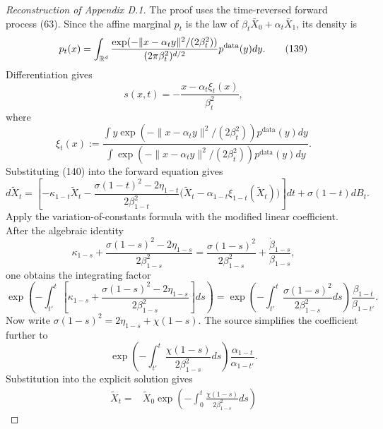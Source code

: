 \begin{proof}[Reconstruction of Appendix D.1]
The proof uses the time-reversed forward process (63).  Since the affine marginal $p_t$ is the law of $\beta_t\bar X_0+\alpha_t\bar X_1$, its density is
\begin{equation*}
 p_t(x)=\int_{\mathbb{R}^d}
 \frac{\exp(-\|x-\alpha_ty\|^2/(2\beta_t^2))}{(2\pi\beta_t^2)^{d/2}}
 p^{\mathrm{data}}(y)dy.
 \tag{139}
\end{equation*}
Differentiation gives
\begin{equation*}
 s(x,t)=-\frac{x-\alpha_t\xi_t(x)}{\beta_t^2},
 \tag{140}
\end{equation*}
where
\begin{equation*}
 \xi_t(x):=
 \frac{\int y\exp(-\|x-\alpha_ty\|^2/(2\beta_t^2))p^{\mathrm{data}}(y)dy}
 {\int \exp(-\|x-\alpha_ty\|^2/(2\beta_t^2))p^{\mathrm{data}}(y)dy}.
 \tag{141}
\end{equation*}
Substituting (140) into the forward equation gives
\begin{equation*}
 d\widetilde X_t=
 \left[
 -\kappa_{1-t}\widetilde X_t
 -\frac{\sigma(1-t)^2-2\eta_{1-t}}{2\beta_{1-t}^2}
 \bigl(\widetilde X_t-\alpha_{1-t}\xi_{1-t}(\widetilde X_t)\bigr)
 \right]dt
 +\sigma(1-t)dB_t.
 \tag{142}
\end{equation*}
Apply the variation-of-constants formula with the modified linear coefficient.  After the algebraic identity
\begin{equation*}
 \kappa_{1-s}
 +\frac{\sigma(1-s)^2-2\eta_{1-s}}{2\beta_{1-s}^2}
 =\frac{\sigma(1-s)^2}{2\beta_{1-s}^2}
 +\frac{\dot\beta_{1-s}}{\beta_{1-s}},
 \tag{144}
\end{equation*}
one obtains the integrating factor
\begin{equation*}
 \exp\left(
 -\int_{t'}^t
 \left[
 \kappa_{1-s}+\frac{\sigma(1-s)^2-2\eta_{1-s}}{2\beta_{1-s}^2}
 \right]ds
 \right)
 =
 \exp\left(-\int_{t'}^t\frac{\sigma(1-s)^2}{2\beta_{1-s}^2}ds\right)
 \frac{\beta_{1-t}}{\beta_{1-t'}}.
 \tag{146}
\end{equation*}
Now write $\sigma(1-s)^2=2\eta_{1-s}+\chi(1-s)$.  The source simplifies the coefficient further to
\begin{equation*}
 \exp\left(-\int_{t'}^t\frac{\chi(1-s)}{2\beta_{1-s}^2}ds\right)
 \frac{\alpha_{1-t}}{\alpha_{1-t'}}.
 \tag{148}
\end{equation*}
Substitution into the explicit solution gives
\begin{align*}
 \widetilde X_t={}&
 \widetilde X_0
 \exp\left(-\int_0^t\frac{\chi(1-s)}{2\beta_{1-s}^2}ds\right)

\end{align*}
\end{proof}
